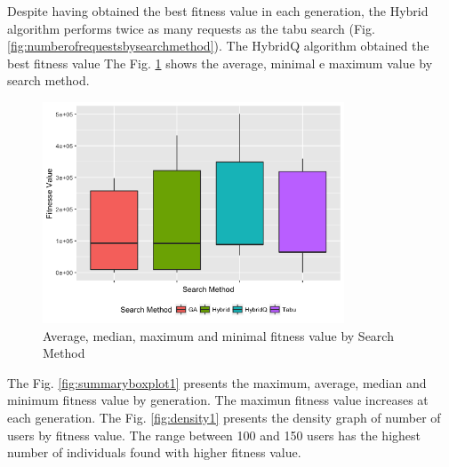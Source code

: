 Despite having obtained the best fitness value in each generation, the Hybrid algorithm performs twice as many requests as the  tabu search (Fig. \ref{fig:numberofrequestsbysearchmethod}). The HybridQ algorithm obtained the best fitness value The Fig. \ref{fig:boxplot1} shows the average, minimal e maximum value by search method.



\begin{figure}[H]
\centering
\includegraphics[width=0.8\textwidth]{./images/experiment1-4.png}
\caption{Average, median, maximum and minimal fitness value by Search Method}
\label{fig:boxplot1}

\end{figure}

The Fig. \ref{fig:summaryboxplot1} presents the maximum, average, median and minimum fitness value by generation. The maximun fitness value increases at each generation. The Fig. \ref{fig:density1} presents the density graph of number of users by fitness value. The range between 100 and 150 users has the highest number of individuals found with higher fitness value.

